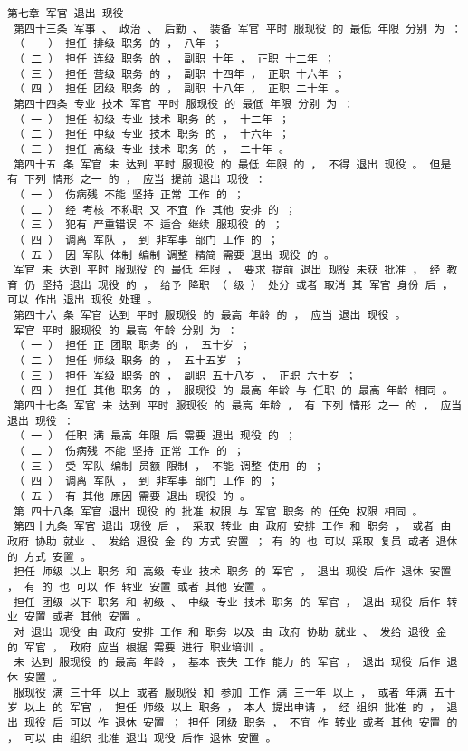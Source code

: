 \documentclass{article}
\begin{document}
\begin{Verbatim}[commandchars=\\\{\}]
 第七章 军官 退出 现役 
 第四十三条 军事 、 政治 、 后勤 、 装备 军官 平时 服现役 的 最低 年限 分别 为 ： 
 （ 一 ） 担任 排级 职务 的 ， 八年 ； 
 （ 二 ） 担任 连级 职务 的 ， 副职 十年 ， 正职 十二年 ； 
 （ 三 ） 担任 营级 职务 的 ， 副职 十四年 ， 正职 十六年 ； 
 （ 四 ） 担任 团级 职务 的 ， 副职 十八年 ， 正职 二十年 。 
 第四十四条 专业 技术 军官 平时 服现役 的 最低 年限 分别 为 ： 
 （ 一 ） 担任 初级 专业 技术 职务 的 ， 十二年 ； 
 （ 二 ） 担任 中级 专业 技术 职务 的 ， 十六年 ； 
 （ 三 ） 担任 高级 专业 技术 职务 的 ， 二十年 。 
 第四十五 条 军官 未 达到 平时 服现役 的 最低 年限 的 ， 不得 退出 现役 。 但是 有 下列 情形 之一 的 ， 应当 提前 退出 现役 ： 
 （ 一 ） 伤病残 不能 坚持 正常 工作 的 ； 
 （ 二 ） 经 考核 不称职 又 不宜 作 其他 安排 的 ； 
 （ 三 ） 犯有 严重错误 不 适合 继续 服现役 的 ； 
 （ 四 ） 调离 军队 ， 到 非军事 部门 工作 的 ； 
 （ 五 ） 因 军队 体制 编制 调整 精简 需要 退出 现役 的 。 
 军官 未 达到 平时 服现役 的 最低 年限 ， 要求 提前 退出 现役 未获 批准 ， 经 教育 仍 坚持 退出 现役 的 ， 给予 降职 （ 级 ） 处分 或者 取消 其 军官 身份 后 ， 可以 作出 退出 现役 处理 。 
 第四十六 条 军官 达到 平时 服现役 的 最高 年龄 的 ， 应当 退出 现役 。 
 军官 平时 服现役 的 最高 年龄 分别 为 ： 
 （ 一 ） 担任 正 团职 职务 的 ， 五十岁 ； 
 （ 二 ） 担任 师级 职务 的 ， 五十五岁 ； 
 （ 三 ） 担任 军级 职务 的 ， 副职 五十八岁 ， 正职 六十岁 ； 
 （ 四 ） 担任 其他 职务 的 ， 服现役 的 最高 年龄 与 任职 的 最高 年龄 相同 。 
 第四十七条 军官 未 达到 平时 服现役 的 最高 年龄 ， 有 下列 情形 之一 的 ， 应当 退出 现役 ： 
 （ 一 ） 任职 满 最高 年限 后 需要 退出 现役 的 ； 
 （ 二 ） 伤病残 不能 坚持 正常 工作 的 ； 
 （ 三 ） 受 军队 编制 员额 限制 ， 不能 调整 使用 的 ； 
 （ 四 ） 调离 军队 ， 到 非军事 部门 工作 的 ； 
 （ 五 ） 有 其他 原因 需要 退出 现役 的 。 
 第 四十八条 军官 退出 现役 的 批准 权限 与 军官 职务 的 任免 权限 相同 。 
 第四十九条 军官 退出 现役 后 ， 采取 转业 由 政府 安排 工作 和 职务 ， 或者 由 政府 协助 就业 、 发给 退役 金 的 方式 安置 ； 有 的 也 可以 采取 复员 或者 退休 的 方式 安置 。 
 担任 师级 以上 职务 和 高级 专业 技术 职务 的 军官 ， 退出 现役 后作 退休 安置 ， 有 的 也 可以 作 转业 安置 或者 其他 安置 。 
 担任 团级 以下 职务 和 初级 、 中级 专业 技术 职务 的 军官 ， 退出 现役 后作 转业 安置 或者 其他 安置 。 
 对 退出 现役 由 政府 安排 工作 和 职务 以及 由 政府 协助 就业 、 发给 退役 金 的 军官 ， 政府 应当 根据 需要 进行 职业培训 。 
 未 达到 服现役 的 最高 年龄 ， 基本 丧失 工作 能力 的 军官 ， 退出 现役 后作 退休 安置 。 
 服现役 满 三十年 以上 或者 服现役 和 参加 工作 满 三十年 以上 ， 或者 年满 五十岁 以上 的 军官 ， 担任 师级 以上 职务 ， 本人 提出申请 ， 经 组织 批准 的 ， 退出 现役 后 可以 作 退休 安置 ； 担任 团级 职务 ， 不宜 作 转业 或者 其他 安置 的 ， 可以 由 组织 批准 退出 现役 后作 退休 安置 。 

\end{Verbatim}
\end{document}
